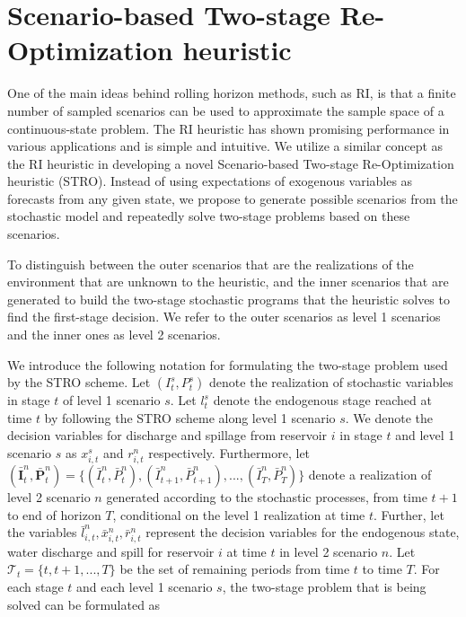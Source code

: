 \section{Scenario-based Two-stage Re-Optimization heuristic}
\label{subsection:proposed_method_generalization}

One of the main ideas behind rolling horizon methods, such as RI, is that a finite number of sampled scenarios can be used to approximate the sample space of a continuous-state problem. The RI heuristic has shown promising performance in various applications and is simple and intuitive. We utilize a similar concept as the RI heuristic in developing a novel Scenario-based Two-stage Re-Optimization heuristic (STRO). Instead of using expectations of exogenous variables as forecasts from any given state, we propose to generate possible scenarios from the stochastic model and repeatedly solve two-stage problems based on these scenarios.

To distinguish between the outer scenarios that are the realizations of the environment that are unknown to the heuristic, and the inner scenarios that are generated to build the two-stage stochastic programs that the heuristic solves to find the first-stage decision. We refer to the outer scenarios as level 1 scenarios and the inner ones as level 2 scenarios.

\color{red}
We introduce the following notation for formulating the two-stage problem used by the STRO scheme. Let $(I_t^{s},P_t^{s})$ denote the realization of stochastic variables in stage $t$ of level 1 scenario $s$. Let $l_t^{s}$ denote the endogenous stage reached at time $t$ by following the STRO scheme along level 1 scenario $s$. We denote the decision variables for discharge and spillage from reservoir $i$ in stage $t$ and level 1 scenario $s$ as $x_{i,t}^s$ and $r_{i,t}^n$ respectively. Furthermore, let $(\bar{\boldsymbol{I}}_t^{n},\bar{\boldsymbol{P}}_t^{n}) = \{(\bar{I}_t^{n},\bar{P}_t^{n}), (\bar{I}_{t+1}^{n},\bar{P}_{t+1}^{n}), ..., (\bar{I}_{T}^{n},\bar{P}_{T}^{n})\}$ denote a realization of level 2 scenario $n$ generated according to the stochastic processes, from time $t+1$ to end of horizon $T$, conditional on the level 1 realization at time $t$. Further, let the variables $\bar{l}_{i,t}^{n}, \bar{x}_{i,t}^{n}, \bar{r}_{i,t}^{n}$ represent the decision variables for the endogenous state, water discharge and spill for reservoir $i$ at time $t$ in level 2 scenario $n$. Let $\mathcal{T}_t = \{t, t+1, ..., T\}$ be the set of remaining periods from time $t$ to time $T$. For each stage $t$ and each level 1 scenario $s$, the two-stage problem that is being solved can be formulated as

